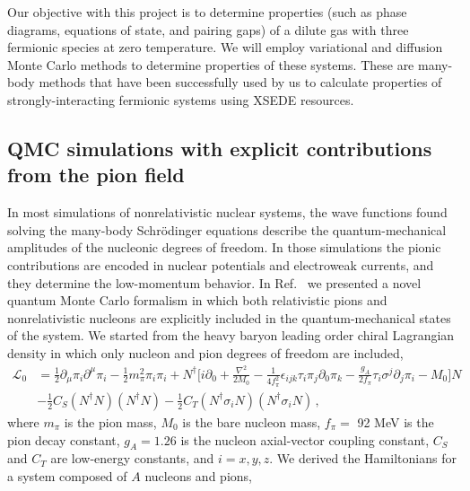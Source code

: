 \documentclass[12pt,letterpaper]{article}
\begin{document}
Our objective with this project is to determine properties (such as phase diagrams, equations of state, and pairing gaps) of a dilute gas with three
fermionic species at zero temperature. We will employ variational and
diffusion Monte Carlo methods to determine properties of these systems.
These are many-body methods that have been
successfully used by us to calculate properties of strongly-interacting
fermionic systems \cite{mad16,mad17,mad18,madeira19} using
XSEDE resources.

\subsection{QMC simulations with explicit contributions from the pion field}
\label{sec:pions}

In most simulations of nonrelativistic nuclear systems, the wave functions found solving
the many-body Schr\"odinger equations describe the quantum-mechanical amplitudes of
the nucleonic degrees of freedom. In those simulations the pionic contributions are
encoded in nuclear potentials and electroweak currents, and they determine
the low-momentum behavior. In Ref.~\cite{mad18} we presented a novel quantum Monte Carlo formalism in
which both relativistic pions and nonrelativistic nucleons are explicitly included in the quantum-mechanical 
states of the system.
We started from the
heavy baryon leading order chiral Lagrangian density in which only nucleon and pion degrees of freedom are included,
\begin{eqnarray}
\mathcal{L}_0 &=
\frac{1}{2}\partial_\mu \pi_i \partial^\mu \pi_i
- \frac{1}{2} m_\pi^2 \pi_i \pi_i + N^\dagger \Big[ i\partial_0 +\frac{\nabla^2}{2M_0}
- \frac{1}{4f_\pi^2}\epsilon_{ijk} \tau_i \pi_j \partial_0\pi_k 
-\frac{g_A}{2f_\pi} \tau_i \sigma^j \partial_j \pi_i
-M_0\Big] N\nonumber \\
&
-\frac{1}{2} C_S(N^\dagger N) (N^\dagger N)
-\frac{1}{2} C_T (N^\dagger \sigma_i N) (N^\dagger \sigma_i N)\, ,
\label{eq:L_0}
\end{eqnarray}
where $m_\pi$ is the pion mass,
$M_0$ is the bare nucleon mass,
$f_\pi=$ 92 MeV is the pion decay constant,
$g_A=1.26$ is the nucleon axial-vector coupling constant, $C_S$ and $C_T$ are low-energy constants, and $i = x, y, z$. We derived the
Hamiltonians for a system composed of $A$ nucleons and pions,
\end{document}
